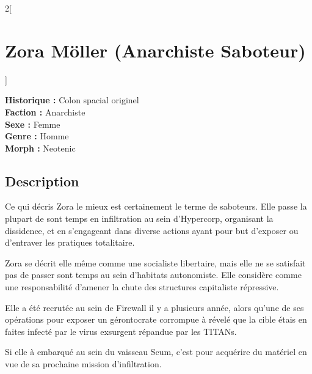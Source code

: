 \documentclass[a4paper,9pt]{article}
\begin{document}
\begin{multicols}{2}[\section*{Zora Möller (Anarchiste Saboteur)}]
   
   \noindent\textbf{Historique :} Colon spacial originel\\
   \noindent\textbf{Faction :} Anarchiste\\
   \noindent\textbf{Sexe :} Femme\\
   \noindent\textbf{Genre :} Homme\\
   \noindent\textbf{Morph :} Neotenic\\

   \subsection*{Description}

   Ce qui décris Zora le mieux est certainement le terme de saboteurs.
   Elle passe la plupart de sont temps en infiltration au sein d'Hypercorp,
   organisant la dissidence, et en s'engageant dans diverse actions ayant pour but
   d'exposer ou d'entraver les pratiques totalitaire.
   
   Zora se décrit elle même comme une socialiste libertaire, mais elle ne se satisfait
   pas de passer sont temps au sein d'habitats autonomiste.
   Elle considère comme une responsabilité d'amener la chute des structures capitaliste
   répressive.
   
   Elle a été recrutée au sein de Firewall il y a plusieurs année, alors qu'une de
   ses opérations pour exposer un gérontocrate corrompue à révelé que la cible étais en 
   faites infecté par le virus exsurgent répandue par les TITANs.
   
   Si elle à embarqué au sein du vaisseau Scum, c'est pour acquérire du
   matériel en vue de sa prochaine mission d'infiltration.


\end{multicols}
\end{document}
